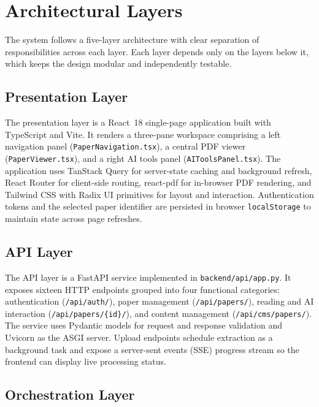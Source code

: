 \documentclass[12pt,a4paper]{report}
\begin{document}
\section{Architectural Layers}

The system follows a five-layer architecture with clear separation of
responsibilities across each layer. Each layer depends only on the layers
below it, which keeps the design modular and independently testable.

\subsection{Presentation Layer}

The presentation layer is a React~18 single-page application built with
TypeScript and Vite. It renders a three-pane workspace comprising a left
navigation panel (\texttt{PaperNavigation.tsx}), a central PDF viewer
(\texttt{PaperViewer.tsx}), and a right AI tools panel
(\texttt{AIToolsPanel.tsx}). The application uses TanStack Query for
server-state caching and background refresh, React Router for client-side
routing, react-pdf for in-browser PDF rendering, and Tailwind CSS with Radix
UI primitives for layout and interaction. Authentication tokens and the
selected paper identifier are persisted in browser \texttt{localStorage} to
maintain state across page refreshes.

\subsection{API Layer}

The API layer is a FastAPI service implemented in \texttt{backend/api/app.py}.
It exposes sixteen HTTP endpoints grouped into four functional categories:
authentication (\texttt{/api/auth/}), paper management
(\texttt{/api/papers/}), reading and AI interaction
(\texttt{/api/papers/\{id\}/}), and content management
(\texttt{/api/cms/papers/}). The service uses Pydantic models for request and
response validation and Uvicorn as the ASGI server. Upload endpoints schedule
extraction as a background task and expose a server-sent events (SSE) progress
stream so the frontend can display live processing status.

\subsection{Orchestration Layer}
\end{document}

